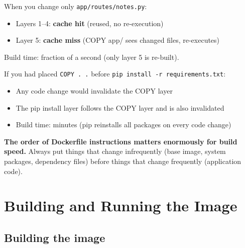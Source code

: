 \noindent{}When you change only \texttt{app/}\allowbreak{}\texttt{routes/}\allowbreak{}\texttt{notes.py}:

\begin{itemize}
\tightlist
\item
  Layers 1--4: \textbf{cache hit} (reused, no re-execution)
\item
  Layer 5: \textbf{cache miss} (COPY app/ sees changed files, re-executes)
\end{itemize}

\noindent{}Build time: fraction of a second (only layer 5 is re-built).

If you had placed \texttt{COPY\ .\ .} before \texttt{pip\ install\ -}\allowbreak{}\texttt{r\ requirements.}\allowbreak{}\texttt{txt}:

\begin{itemize}
\tightlist
\item
  Any code change would invalidate the COPY layer
\item
  The pip install layer follows the COPY layer and is also invalidated
\item
  Build time: minutes (pip reinstalls all packages on every code change)
\end{itemize}

\noindent{}\textbf{The order of Dockerfile instructions matters enormously for build speed.} Always put things that change infrequently (base image, system packages, dependency files) before things that change frequently (application code).

\setcounter{section}{4}
\section{Building and Running the Image}\label{18-containerization:185-building-and-running-the-image}

\subsection*{Building the image}\label{18-containerization:building-the-image}

\begin{codebox}[short]

\begin{Shaded}
\begin{Highlighting}[]

\end{Highlighting}
\end{Shaded}

\end{codebox}

